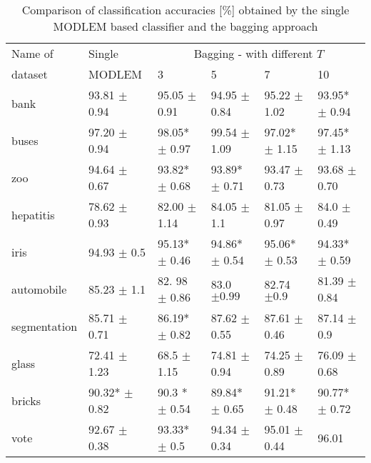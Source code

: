 \documentclass{llncs}
\begin{document}
\begin{table}
\label{bagging} \centering \caption{Comparison of classification accuracies
[\%] obtained by the single MODLEM based classifier and the bagging
approach} {\footnotesize
\begin{tabular}{llllll}
\hline\noalign{\smallskip}
Name of &  Single & \multicolumn{4}{c}{Bagging - with different $T$} \\ %
dataset  & MODLEM & 3 & 5 & 7 & 10 \\ \noalign{\smallskip} \hline
\noalign{\smallskip} bank & 93.81 \scriptsize{$\pm$}  0.94 & 95.05
\scriptsize{$\pm$} 0.91 & 94.95 \scriptsize{$\pm$} 0.84 &  95.22
\scriptsize{$\pm$} 1.02 & 93.95* \scriptsize{$\pm$} 0.94 \\ buses & 97.20
\scriptsize{$\pm$ 0.94} & 98.05* \scriptsize{$\pm$ 0.97} & 99.54
\scriptsize{$\pm$ 1.09} & 97.02* \scriptsize{$\pm$ 1.15} & 97.45*
\scriptsize{$\pm$ 1.13} \\ zoo & 94.64 \scriptsize{$\pm$ 0.67}& 93.82*
\scriptsize{$\pm$ 0.68} & 93.89* \scriptsize{$\pm$ 0.71} & 93.47
\scriptsize{$\pm$ 0.73} & 93.68 \scriptsize{$\pm$ 0.70} \\  hepatitis &
78.62 \scriptsize{$\pm$ 0.93} & 82.00 \scriptsize{$\pm$ 1.14} & 84.05
\scriptsize{$\pm$ 1.1} & 81.05 \scriptsize{$\pm$ 0.97} & 84.0
\scriptsize{$\pm$ 0.49} \\ iris & 94.93 \scriptsize{$\pm$ 0.5} & 95.13*
\scriptsize{$\pm$ 0.46} & 94.86* \scriptsize{$\pm$ 0.54} & 95.06*
\scriptsize{$\pm$ 0.53} & 94.33* \scriptsize{$\pm$ 0.59} \\ automobile &
85.23 \scriptsize{$\pm$ 1.1} & 82. 98 \scriptsize{$\pm$ 0.86} & 83.0
\scriptsize{$\pm 0.99$} & 82.74 \scriptsize{$\pm 0.9$} & 81.39
\scriptsize{$\pm$ 0.84}\\ segmentation & 85.71 \scriptsize{$\pm$ 0.71} &
86.19* \scriptsize{$\pm$ 0.82} & 87.62 \scriptsize{$\pm$ 0.55} & 87.61
\scriptsize{$\pm$ 0.46}& 87.14 \scriptsize{$\pm$ 0.9} \\ glass & 72.41
\scriptsize{$\pm$ 1.23} & 68.5 \scriptsize{$\pm$ 1.15} & 74.81
\scriptsize{$\pm$ 0.94} & 74.25 \scriptsize{$\pm$ 0.89} & 76.09
\scriptsize{$\pm$ 0.68} \\ bricks & 90.32* \scriptsize{$\pm$ 0.82} & 90.3 *
\scriptsize{$\pm$ 0.54} & 89.84* \scriptsize{$\pm$ 0.65} & 91.21*
\scriptsize{$\pm$ 0.48} & 90.77* \scriptsize{$\pm$ 0.72} \\ vote & 92.67
\scriptsize{$\pm$ 0.38} & 93.33* \scriptsize{$\pm$ 0.5} & 94.34
\scriptsize{$\pm$ 0.34} & 95.01 \scriptsize{$\pm$ 0.44} & 96.01

\end{tabular}}
\end{table}
\end{document}
